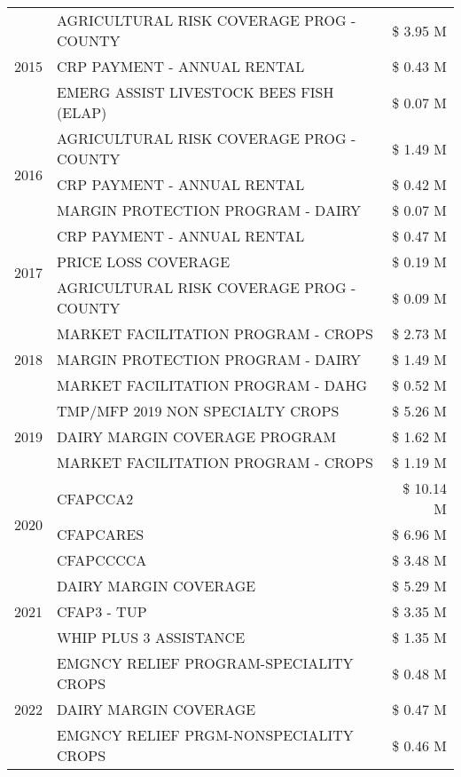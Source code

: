 \begin{tabular}{llr}
\multirow[t]{3}{*}{2015} & AGRICULTURAL RISK COVERAGE PROG - COUNTY & \$ 3.95 M \\
 & CRP PAYMENT - ANNUAL RENTAL & \$ 0.43 M \\
 & EMERG ASSIST LIVESTOCK BEES FISH (ELAP) & \$ 0.07 M \\
\cline{1-3}
\multirow[t]{3}{*}{2016} & AGRICULTURAL RISK COVERAGE PROG - COUNTY & \$ 1.49 M \\
 & CRP PAYMENT - ANNUAL RENTAL & \$ 0.42 M \\
 & MARGIN PROTECTION PROGRAM - DAIRY & \$ 0.07 M \\
\cline{1-3}
\multirow[t]{3}{*}{2017} & CRP PAYMENT - ANNUAL RENTAL & \$ 0.47 M \\
 & PRICE LOSS COVERAGE & \$ 0.19 M \\
 & AGRICULTURAL RISK COVERAGE PROG - COUNTY & \$ 0.09 M \\
\cline{1-3}
\multirow[t]{3}{*}{2018} & MARKET FACILITATION PROGRAM - CROPS & \$ 2.73 M \\
 & MARGIN PROTECTION PROGRAM - DAIRY & \$ 1.49 M \\
 & MARKET FACILITATION PROGRAM - DAHG & \$ 0.52 M \\
\cline{1-3}
\multirow[t]{3}{*}{2019} & TMP/MFP 2019 NON SPECIALTY CROPS & \$ 5.26 M \\
 & DAIRY MARGIN COVERAGE PROGRAM & \$ 1.62 M \\
 & MARKET FACILITATION PROGRAM - CROPS & \$ 1.19 M \\
\cline{1-3}
\multirow[t]{3}{*}{2020} & CFAPCCA2 & \$ 10.14 M \\
 & CFAPCARES & \$ 6.96 M \\
 & CFAPCCCCA & \$ 3.48 M \\
\cline{1-3}
\multirow[t]{3}{*}{2021} & DAIRY MARGIN COVERAGE & \$ 5.29 M \\
 & CFAP3 - TUP & \$ 3.35 M \\
 & WHIP PLUS 3 ASSISTANCE & \$ 1.35 M \\
\cline{1-3}
\multirow[t]{3}{*}{2022} & EMGNCY RELIEF PROGRAM-SPECIALITY CROPS & \$ 0.48 M \\
 & DAIRY MARGIN COVERAGE & \$ 0.47 M \\
 & EMGNCY RELIEF PRGM-NONSPECIALITY CROPS & \$ 0.46 M \\
\cline{1-3}
\bottomrule
\end{tabular}
